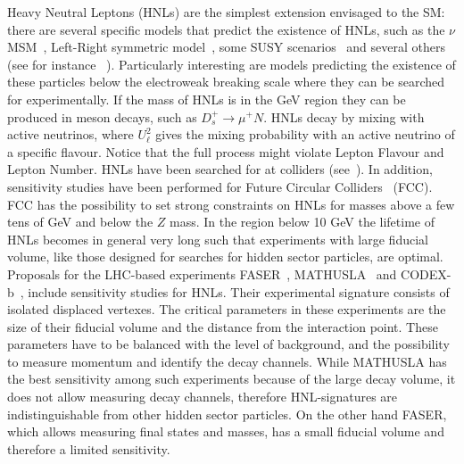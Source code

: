 

Heavy Neutral Leptons (HNLs) are the simplest extension envisaged to the SM:
there are several specific models that predict the existence of HNLs, such as the $\nu$MSM~\cite{Asaka:2005pn}, Left-Right symmetric model~\cite{Pati:1974yy,Mohapatra:1974gc,Senjanovic:1975rk}, some SUSY scenarios~\cite{LopezFogliani:2005yw} and several others (see for instance ~\cite{Akhmedov:1998qx,Kersten:2007vk}). Particularly interesting are models predicting the existence of these particles below the electroweak breaking scale where they can be searched for experimentally. 
If the mass of HNLs is in the GeV region they can be produced in meson decays, such as $D_s^+\to \mu^+ N$. HNLs  decay by mixing with active neutrinos, %
where $U_{\ell}^2$ gives the mixing probability with an active neutrino of a specific flavour. Notice that the full process might violate Lepton Flavour and Lepton Number. 
HNLs have been searched for at colliders (see~\cite{Sirunyan:2018mtv,ATLAS:2012ak,Aaij:2014aba}). In addition, sensitivity studies have been performed for Future Circular Colliders~\cite{Blondel:2014bra,Drewes:2016jae,Antusch:2017pkq} (FCC). FCC has the possibility to set strong constraints on HNLs for masses above a few tens of GeV and below the $Z$ mass. In the region below 10 GeV the lifetime of HNLs becomes in general very long such that experiments with large fiducial volume, like those designed for searches for hidden sector particles, are optimal. 
Proposals for the LHC-based experiments FASER~\cite{Feng:2017uoz}, MATHUSLA~\cite{Curtin:2018mvb} and CODEX-b~\cite{Gligorov:2017nwh}, include sensitivity studies for HNLs. Their experimental signature  consists of isolated displaced vertexes. The critical parameters in these experiments are the size of their fiducial volume and the distance from the interaction point. These parameters have to be balanced with the level of background, and the possibility to measure momentum and identify the decay channels. While MATHUSLA has the best sensitivity among such experiments because of the large decay volume, it does not allow measuring decay channels, therefore HNL-signatures are indistinguishable from other hidden sector particles. On the other hand FASER, which allows measuring final states and masses, has a small fiducial volume and therefore a limited sensitivity. 

